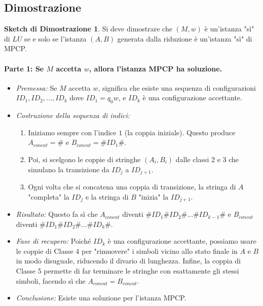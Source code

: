 \documentclass[a4paper]{article}
\theoremstyle{definition} %
\newtheorem{proof_sketch}{Sketch di Dimostrazione} %
\theoremstyle{remark} %
\begin{document}
\subsection{Dimostrazione}
\begin{proof_sketch}
Si deve dimostrare che $(M, w)$ è un'istanza "sì" di $LU$ se e solo se l'istanza $(A, B)$ generata dalla riduzione è un'istanza "sì" di MPCP.

\paragraph{Parte 1: Se $M$ accetta $w$, allora l'istanza MPCP ha soluzione.}

\begin{itemize}
    \item \emph{Premessa:} Se $M$ accetta $w$, significa che esiste una sequenza di configurazioni $ID_1, ID_2, \dots, ID_k$ dove $ID_1 = q_0 w$, e $ID_k$ è una configurazione accettante.
    
    \item \emph{Costruzione della sequenza di indici:}
    \begin{enumerate}
        \item Iniziamo sempre con l'indice $1$ (la coppia iniziale). Questo produce $A_{concat} = \#$ e $B_{concat} = \#ID_1\#$.
        \item Poi, si scelgono le coppie di stringhe $(A_i, B_i)$ dalle classi 2 e 3 che simulano la transizione da $ID_j$ a $ID_{j+1}$. 
        \item Ogni volta che si concatena una coppia di transizione, la stringa di $A$ "completa" la $ID_j$ e la stringa di $B$ "inizia" la $ID_{j+1}$.
    \end{enumerate}
    
    \item \emph{Risultato:} Questo fa sì che $A_{concat}$ diventi $\#ID_1\#ID_2\# \dots \#ID_{k-1}\#$ e $B_{concat}$ diventi $\#ID_1\#ID_2\# \dots \#ID_k\#$.
    
    \item \emph{Fase di recupero:} Poiché $ID_k$ è una configurazione accettante, possiamo usare le coppie di Classe 4 per "rimuovere" i simboli vicino allo stato finale in $A$ e $B$ in modo disuguale, riducendo il divario di lunghezza. Infine, la coppia di Classe 5 permette di far terminare le stringhe con esattamente gli stessi simboli, facendo sì che $A_{concat} = B_{concat}$.
    
    \item \emph{Conclusione:} Esiste una soluzione per l'istanza MPCP.
\end{itemize}


\end{proof_sketch}
\end{document}
